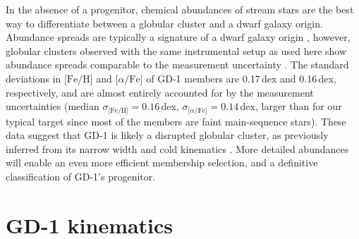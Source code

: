 \documentclass[twocolumn]{aastex63}
\newcommand{\feh}{\ensuremath{\textrm{[Fe/H]}}}
\newcommand{\afe}{\ensuremath{\textrm{[$\alpha$/Fe]}}}
\begin{document}
In the absence of a progenitor, chemical abundances of stream stars are the best way to differentiate between a globular cluster and a dwarf galaxy origin.
Abundance spreads are typically a signature of a dwarf galaxy origin \citep[e.g.,][]{willman2012}, however, globular clusters observed with the same instrumental setup as used here show abundance spreads comparable to the measurement uncertainty \citep[$\approx0.05-0.1$\,dex,][]{cargile2019}.
The standard deviations in $\feh$ and $\afe$ of GD-1 members are 0.17\,dex and 0.16\,dex, respectively, and are almost entirely accounted for by the measurement uncertainties (median $\sigma_\feh=0.16$\,dex, $\sigma_\afe=0.14$\,dex, larger than for our typical target since most of the members are faint main-sequence stars).
These data suggest that GD-1 is likely a disrupted globular cluster, as previously inferred from its narrow width \citep[e.g.,][]{grillmair2006} and cold kinematics \citep[e.g.,][]{malhan2019}.
More detailed abundances will enable an even more efficient membership selection, and a definitive classification of GD-1's progenitor.


\section{GD-1 kinematics}
\label{sec:kinematics}
\end{document}
